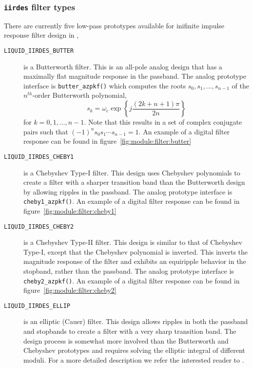 \subsubsection{{\tt iirdes} filter types}
\label{module:filter:iirdes:types}
There are currently five low-pass prototypes available for inifinite impulse
response filter design in \liquid,
\begin{description}
\item[{\tt LIQUID\_IIRDES\_BUTTER}]
    is a Butterworth filter.
    This is an all-pole analog design that has a maximally flat magnitude
    response in the passband.
    The analog prototype interface is {\tt butter\_azpkf()} which computes the
    roots $s_0,s_1,\ldots,s_{n-1}$ of the $n^{th}$-order Butterworth
    polynomial,
    \[
        s_k = \omega_c \exp\left\{
                    j \frac{\left(2k+n+1\right)\pi}{2n}
              \right\}
    \]
    for $k=0,1,\ldots,n-1$.
    Note that this results in a set of complex conjugate pairs such that
    $(-1)^n s_0 s_1 \cdots s_{n-1} = 1$.
    An example of a digital filter response can be found in
    figure~\ref{fig:module:filter:butter}
\item[{\tt LIQUID\_IIRDES\_CHEBY1}]
    is a Chebyshev Type-I filter.
    This design uses Chebyshev polynomials to create a filter with a sharper
    transition band than the Butterworth design by allowing ripples in the
    passband.
    The analog prototype interface is {\tt cheby1\_azpkf()}.
    An example of a digital filter response can be found in
    figure~\ref{fig:module:filter:cheby1}
\item[{\tt LIQUID\_IIRDES\_CHEBY2}]
    is a Chebyshev Type-II filter.
    This design is similar to that of Chebyshev Type-I, except that the
    Chebyshev polynomial is inverted.
    This inverts the magnitude response of the filter and exhibits an
    equiripple behavior in the stopband, rather than the passband.
    The analog prototype interface is {\tt cheby2\_azpkf()}.
    An example of a digital filter response can be found in
    figure~\ref{fig:module:filter:cheby2}
\item[{\tt LIQUID\_IIRDES\_ELLIP}]
    is an elliptic (Cauer) filter.
    This design allows ripples in both the passband and stopbands to create a
    filter with a very sharp transition band.
    The design process is somewhat more involved than the Butterworth and
    Chebyshev prototypes and requires solving the elliptic integral of
    different moduli.
    For a more detailed description we refer the interested reader to
    \cite{Orfanidis:2006}.

\end{description}
